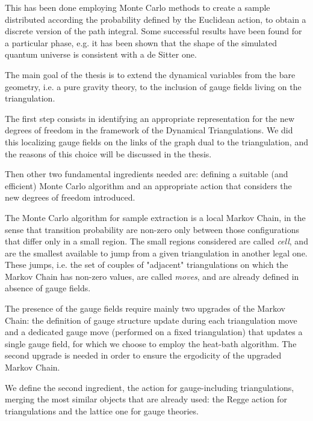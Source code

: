 This has been done employing Monte Carlo methods to create a sample distributed according the probability defined by the Euclidean action, to obtain a discrete version of the path integral. Some successful results have been found for a particular phase, e.g. it has been shown that the shape of the simulated quantum universe is consistent with a de Sitter one.
\newline

\indent The main goal of the thesis is to extend the dynamical variables from the bare geometry, i.e. a pure gravity theory, to the inclusion of gauge fields living on the triangulation.
\newline

\indent The first step consists in identifying an appropriate representation for the new degrees of freedom in the framework of the Dynamical Triangulations. We did this localizing gauge fields on the links of the graph dual to the triangulation, and the reasons of this choice will be discussed in the thesis.

Then other two fundamental ingredients needed are: defining a suitable (and efficient) Monte Carlo algorithm and an appropriate action that considers the new degrees of freedom introduced.
\newline

\indent The Monte Carlo algorithm for sample extraction is a local Markov Chain, in the sense that transition probability are non-zero only between those configurations that differ only in a small region.
The small regions considered are called \textit{cell}, and are the smallest available to jump from a given triangulation in another legal one. These jumps, i.e. the set of couples of "adjacent" triangulations on which the Markov Chain has non-zero values, are called \textit{moves}, and are already defined in absence of gauge fields.

The presence of the gauge fields require mainly two upgrades of the Markov Chain: the definition of gauge structure update during each triangulation move and a dedicated gauge move (performed on a fixed triangulation) that updates a single gauge field, for which we choose to employ the heat-bath algorithm.
The second upgrade is needed in order to ensure the ergodicity of the upgraded Markov Chain.
\newline

\indent We define the second ingredient, the action for gauge-including triangulations, merging the most similar objects that are already used: the Regge action for triangulations and the lattice one for gauge theories.

